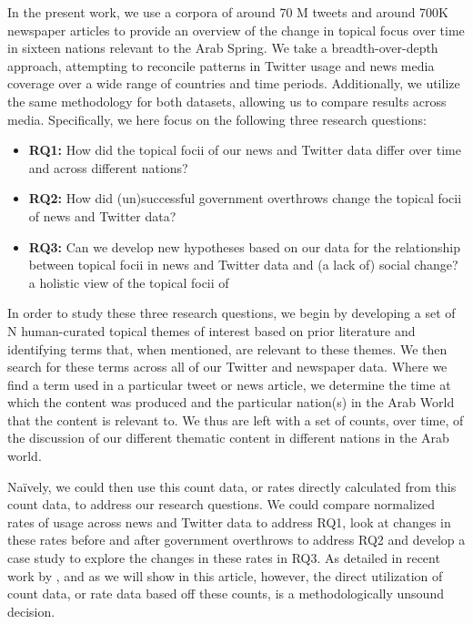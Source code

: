 In the present work, we use a corpora of around 70 M tweets and around 700K newspaper articles to provide an overview of the change in topical focus over time in sixteen nations relevant to the Arab Spring.  We take a breadth-over-depth approach, attempting to reconcile patterns in Twitter usage and news media coverage over a wide range of countries and time periods. Additionally, we utilize the same methodology for both datasets, allowing us to compare results across media.  Specifically, we here focus on the following three research questions:
\begin{itemize}
	\item {\bf RQ1:} How did the topical focii of our news and Twitter data differ over time and across different nations?
	\item {\bf RQ2:} How did (un)successful government overthrows change the topical focii of news and Twitter data?
	\item {\bf RQ3:} Can we develop new hypotheses based on our data for the relationship between topical focii in news and Twitter data and (a lack of) social change? a holistic view of the topical focii of 
\end{itemize}

In order to study these three research questions, we begin by developing a set of N human-curated topical themes of interest based on prior literature and identifying terms that, when mentioned, are relevant to these themes.  We then search for these terms across all of our Twitter and newspaper data.  Where we find a term used in a particular tweet or news article, we determine the time at which the content was produced and the particular nation(s) in the Arab World that the content is relevant to.  We thus are left with a set of counts, over time, of the discussion of our different thematic content in different nations in the Arab world.

Na\"{i}vely, we could then use this count data, or rates directly calculated from this count data, to address our research questions.  We could compare normalized rates of usage across news and Twitter data to address RQ1, look at changes in these rates before and after government overthrows to address RQ2 and develop a case study to explore the changes in these rates in RQ3. As detailed in recent work by \cite{eisenstein_diffusion_2014}, and as we will show in this article, however, the direct utilization of count data, or rate data based off these counts, is a methodologically unsound decision. 

